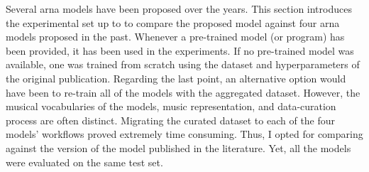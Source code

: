 
Several \gls{arna} models have been proposed over the years.
This section introduces the experimental set up to to
compare the proposed model against four \gls{arna} models
proposed in the past. Whenever a pre-trained model (or
program) has been provided, it has been used in the
experiments. If no pre-trained model was available, one was
trained from scratch using the dataset and hyperparameters
of the original publication. Regarding the last point, an
alternative option would have been to re-train all of the
models with the aggregated dataset. However, the musical
vocabularies of the models, music representation, and
data-curation process are often distinct. Migrating the
curated dataset to each of the four models' workflows proved
extremely time consuming. Thus, I opted for comparing
against the version of the model published in the
literature. Yet, all the models were evaluated on the same
test set.
